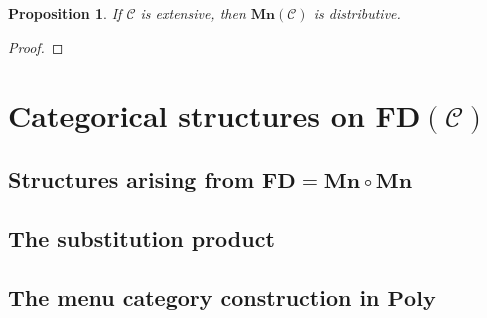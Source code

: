\documentclass[11pt, one side, article]{memoir}
\theoremstyle{definition}
\theoremstyle{plain}
\newtheorem{proposition}[definitionx]{Proposition}
\newcommand{\cat}[1]{\mathcal{#1}}%
\newcommand{\Cat}[1]{\mathbf{#1}}%
\newcommand{\poly}{\Cat{Poly}}
\newcommand{\0}{\textsf{0}}
\newcommand{\1}{\tn{\textsf{1}}}
\newcommand{\2}{\tn{\textsf{2}}}
\newcommand{\3}{\tn{\textsf{3}}}
\newcommand{\4}{\tn{\textsf{4}}}
\newcommand{\5}{\tn{\textsf{5}}}
\newcommand{\6}{\tn{\textsf{6}}}
\newcommand{\7}{\tn{\textsf{7}}}
\newcommand{\8}{\tn{\textsf{8}}}
\newcommand{\9}{\tn{\textsf{9}}}
\newcommand{\fd}{\Cat{FD}}
\newcommand{\mn}{\Cat{Mn}}
\begin{document}
\begin{proposition}
If $\cat{C}$ is extensive, then $\mn(\cat{C})$ is distributive.
\end{proposition}
\begin{proof}

\end{proof}

\chapter{Categorical structures on $\fd(\cat{C})$}
\section{Structures arising from $\fd=\mn\circ\mn$}
\section{The substitution product}

\section{The menu category construction in $\poly$}


\printbibliography
\end{document}

